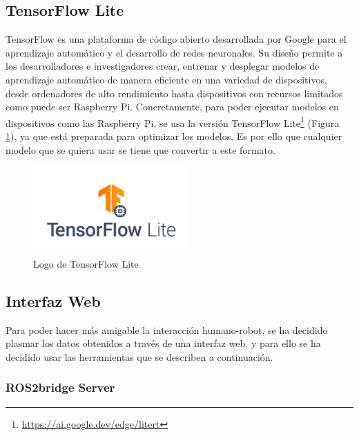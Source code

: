 \subsection{TensorFlow Lite}
\label{subsec:tflite}

TensorFlow es una plataforma de código abierto desarrollada por Google para el aprendizaje automático y el desarrollo de redes neuronales. Su diseño permite a los desarrolladores e investigadores crear, entrenar y desplegar modelos de aprendizaje automático de manera eficiente en una variedad de dispositivos, desde ordenadores de alto rendimiento hasta dispositivos con recursos limitados como puede ser Raspberry Pi. Concretamente, para poder ejecutar modelos en dispositivos como las Raspberry Pi, se usa la versión TensorFlow Lite\footnote{\url{https://ai.google.dev/edge/litert}} (Figura \ref{fig:tflite}), ya que está preparada para optimizar los modelos. Es por ello que cualquier modelo que se quiera usar se tiene que convertir a este formato. 

\begin{figure} [h!]
	\begin{center}
		\includegraphics[width=6cm]{figs/tflite.png}
	\end{center}
	\caption{Logo de TensorFlow Lite} %
	\label{fig:tflite}
\end{figure}


\subsection{Interfaz Web}
\label{subsec:interfazweb}

Para poder hacer más amigable la interacción humano-robot, se ha decidido plasmar los datos obtenidos a través de una interfaz web, y para ello se ha decidido usar las herramientas que se describen a continuación.
 
\subsubsection{ROS2bridge Server}
\label{subsubsec:ros2bridge}


